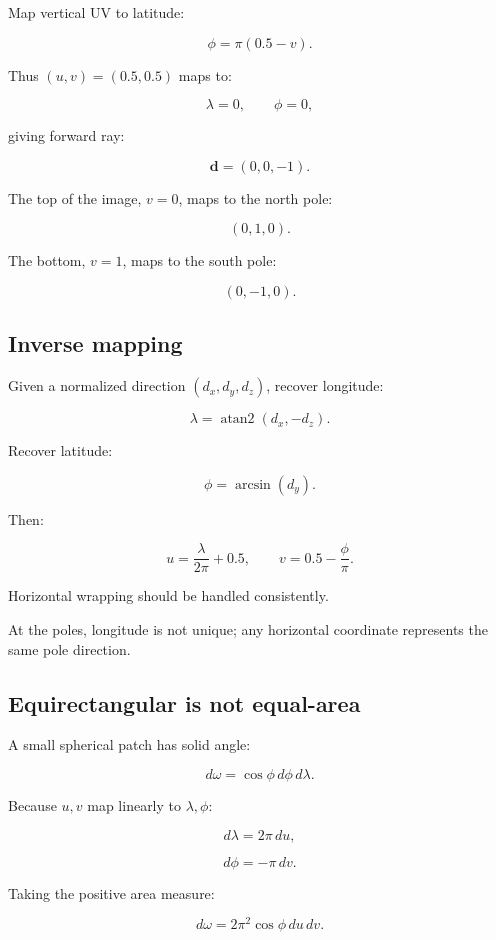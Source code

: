 Map vertical UV to latitude:

\[ \boxed{ \phi=\pi(0.5-v). } \]

Thus \((u,v)=(0.5,0.5)\) maps to:

\[ \lambda=0,\qquad\phi=0, \]

giving forward ray:

\[ \boxed{\mathbf d=(0,0,-1)}. \]

The top of the image, \(v=0\), maps to the north pole:

\[ (0,1,0). \]

The bottom, \(v=1\), maps to the south pole:

\[ (0,-1,0). \]

\subsection{Inverse mapping}\label{02-foundations-ii-ch035-inverse-mapping}

Given a normalized direction \((d_x,d_y,d_z)\), recover longitude:

\[ \boxed{ \lambda=\operatorname{atan2}(d_x,-d_z). } \]

Recover latitude:

\[ \boxed{ \phi=\arcsin(d_y). } \]

Then:

\[ \boxed{ u=\frac{\lambda}{2\pi}+0.5, \qquad v=0.5-\frac{\phi}{\pi}. } \]

Horizontal wrapping should be handled consistently.

At the poles, longitude is not unique; any horizontal coordinate represents the same pole direction.

\subsection{Equirectangular is not equal-area}\label{02-foundations-ii-ch035-equirectangular-is-not-equal-area}

A small spherical patch has solid angle:

\[ \boxed{ d\omega=\cos\phi\,d\phi\,d\lambda. } \]

Because \(u,v\) map linearly to \(\lambda,\phi\):

\[ d\lambda=2\pi\,du, \]

\[ d\phi=-\pi\,dv. \]

Taking the positive area measure:

\[ \boxed{ d\omega=2\pi^2\cos\phi\,du\,dv. } \]


